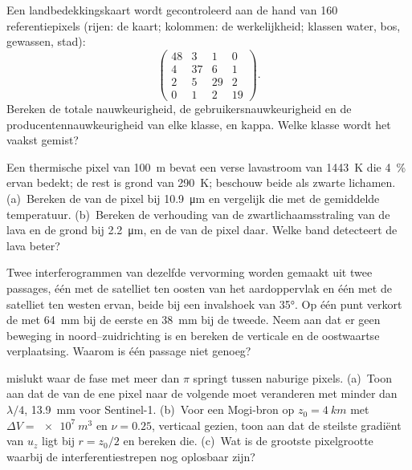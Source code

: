 \begin{exercise}[$\star\star$]\label{exo:b3:remote-sensing-gis:8}
Een landbedekkingskaart wordt gecontroleerd aan de hand van 160 referentiepixels (rijen: de kaart;
kolommen: de werkelijkheid; klassen water, bos, gewassen, stad):
\[
\begin{pmatrix} 48 & 3 & 1 & 0 \\ 4 & 37 & 6 & 1 \\ 2 & 5 & 29 & 2 \\ 0 & 1 & 2 & 19 \end{pmatrix} .
\]
Bereken de totale nauwkeurigheid, de gebruikersnauwkeurigheid en de producentennauwkeurigheid van elke
klasse, en kappa. Welke klasse wordt het vaakst gemist?
\end{exercise}

\begin{exercise}[$\star\star$]\label{exo:b3:remote-sensing-gis:9}
Een thermische pixel van \qty{100}{m} bevat een verse lavastroom van \qty{1443}{K}
die \qty{4}{\percent} ervan bedekt; de rest is grond van \qty{290}{K}; beschouw
beide als zwarte lichamen. (a)~Bereken de  van de pixel
bij \qty{10.9}{\micro\metre} en vergelijk die met de gemiddelde temperatuur.
(b)~Bereken de verhouding van de zwartlichaamsstraling van de lava en de
grond bij \qty{2.2}{\micro\metre}, en de  van de
pixel daar. Welke band detecteert de lava beter?
\end{exercise}

\begin{exercise}[$\star\star\star$]\label{exo:b3:remote-sensing-gis:10}
Twee interferogrammen van dezelfde vervorming worden gemaakt uit twee passages, één
met de satelliet ten oosten van het aardoppervlak en één met de satelliet ten westen ervan,
beide bij een invalshoek van \ang{35}. Op één punt verkort de
 met \qty{64}{mm} bij de eerste en \qty{38}{mm} bij de
tweede. Neem aan dat er geen beweging in noord--zuidrichting is en bereken de verticale en de
oostwaartse verplaatsing. Waarom is één passage niet genoeg?
\end{exercise}

\begin{exercise}[$\star\star\star$]\label{exo:b3:remote-sensing-gis:11}
 mislukt waar de fase met meer dan $\pi$ springt tussen
naburige pixels. (a)~Toon aan dat de  van de ene pixel naar de volgende moet
veranderen met minder dan $\lambda/4$, \qty{13.9}{mm} voor
Sentinel-1. (b)~Voor een Mogi-bron op $z_0 = \qty{4}{km}$ met $\Delta V =
\qty{e7}{m^3}$ en $\nu = 0.25$, verticaal gezien, toon aan dat de steilste
gradiënt van $u_z$ ligt bij $r = z_0/2$ en bereken die. (c)~Wat is de
grootste pixelgrootte waarbij de interferentiestrepen nog oplosbaar zijn?
\end{exercise}


